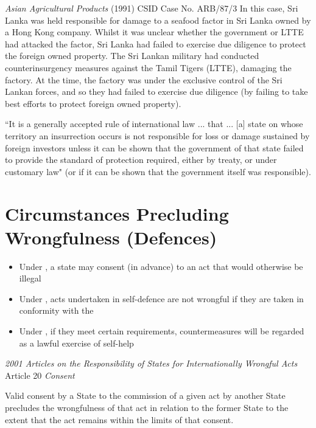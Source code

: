 \begin{casedetails}{\textit{Asian Agricultural Products} (1991) CSID Case No. ARB/87/3}
    \flushleft
    In this case, Sri Lanka was held responsible for damage to a seafood factor in Sri Lanka owned by a Hong Kong company. Whilst it was unclear whether the government or LTTE had attacked the factor, Sri Lanka had failed to exercise due diligence to protect the foreign owned property. The Sri Lankan military had conducted counterinsurgency measures against the Tamil Tigers (LTTE), damaging the factory. At the time, the factory was under the exclusive control of the Sri Lankan forces, and so they had failed to exercise due diligence (by failing to take best efforts to protect foreign owned property).
    
    \vspace{\baselineskip}
    
    ``It is a generally accepted rule of international law ... that ... [a] state on whose territory an insurrection occurs is not responsible for loss or damage sustained by foreign investors unless it can be shown that the government of that state failed to provide the standard of protection required, either by treaty, or under customary law" (or if it can be shown that the government itself was responsible).

\end{casedetails}

\section{Circumstances Precluding Wrongfulness (Defences)}
\begin{itemize}
    \item Under , a state  may consent (in advance) to an act that would otherwise be illegal
    \item Under , acts undertaken in self-defence are not wrongful if they are taken in conformity with the 
    \item Under , if they meet certain requirements, countermeasures will be regarded as a lawful exercise of self-help
\end{itemize}

\begin{conventiondetails}{\textit{2001 Articles on the Responsibility of States for Internationally Wrongful Acts} Article 20}
    \flushleft
    \textit{Consent}

    \vspace{\baselineskip}

    Valid consent by a State to the commission of a given act by another State precludes the wrongfulness of that act in relation to the former State to the extent that the act remains within the limits of that consent.
\end{conventiondetails}

